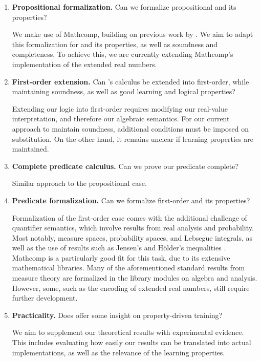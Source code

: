 \begin{enumerate}
     \item \textbf{Propositional formalization.} Can we formalize propositional \OL{} and its properties?

    We make use of Mathcomp, building on previous work by \citeauthor{affeldt2024taming} \citep{affeldt2024taming}. We aim to adapt this formalization for \OL{} and its properties, as well as soundness and completeness. To achieve this, we are currently extending Mathcomp's implementation of the extended real numbers. 
    
    \item \textbf{First-order extension.} Can \OL{}'s calculus be extended into first-order, while maintaining soundness, as well as good learning and logical properties?

    Extending our logic into first-order requires modifying our real-value interpretation, and therefore our algebraic semantics. For our current approach to maintain soundness, additional conditions must be imposed on substitution. On the other hand, it remains unclear if learning properties are maintained. 
    
    \item \textbf{Complete predicate calculus.} Can we prove our predicate \OL{} complete?
    
    Similar approach to the propositional case. 

    \item \textbf{Predicate formalization.} Can we formalize first-order \OL{} and its properties?

    Formalization of the first-order case comes with the additional challenge of quantifier semantics, which involve results from real analysis and probability. Most notably, measure spaces, probability spaces, and Lebsegue integrals, as well as the use of results such as Jensen's  and Hölder's inequalities \citep{mitrinovic1970analytic}. Mathcomp is a particularly good fit for this task, due to its extensive mathematical libraries. Many of the aforementioned standard results from measure theory are formalized in the library modules on algebra and analysis. However, some, such as the encoding of extended real numbers, still require further development.
    
    \item \textbf{Practicality.} Does \OL{} offer some insight on property-driven training?

    We aim to supplement our theoretical results with experimental evidence. This includes evaluating how easily our results can be translated into actual implementations, as well as the relevance of the learning properties.
    
\end{enumerate}